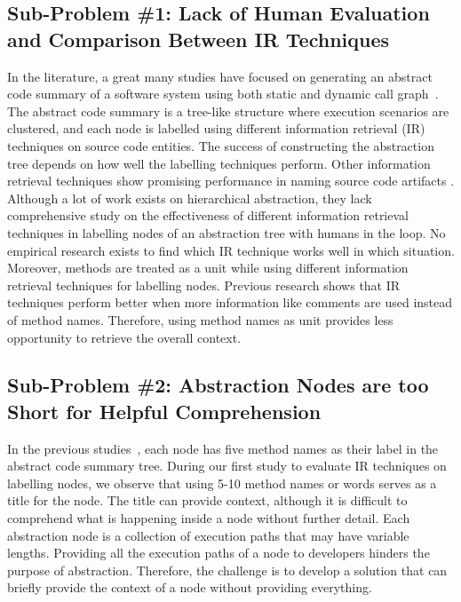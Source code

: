     \subsection{Sub-Problem \#1: Lack of Human Evaluation and Comparison Between IR Techniques} In the literature, a great many studies have focused on generating an abstract code summary of a software system using both static and dynamic call graph~\cite{feng2018hierarchicalExecutionComprehension, gharibi2018automaticStaticCluster, xin2019identifyingFeaturesExecution}. The abstract code summary is a tree-like structure where execution scenarios are clustered, and each node is labelled using different information retrieval (IR) techniques on source code entities. The success of constructing the abstraction tree depends on how well the labelling techniques perform. Other information retrieval techniques show promising performance in naming source code artifacts \cite{chen2016topicMiningRepositories, panichella2013topicModelsTasks, sun2016surveyTopicSE}. Although a lot of work exists on hierarchical abstraction, they lack comprehensive study on the effectiveness of different information retrieval techniques in labelling nodes of an abstraction tree with humans in the loop. No empirical research exists to find which IR technique works well in which situation.
Moreover, methods are treated as a unit \cite{gharibi2018automaticStaticCluster, feng2018hierarchicalExecutionComprehension} while using different information retrieval techniques for labelling nodes. Previous research \cite{de2012IRMethodsArtifacts} shows that IR techniques perform better when more information like comments are used instead of method names. Therefore, using method names as unit provides less opportunity to retrieve the overall context.
    

    \subsection{Sub-Problem \#2: Abstraction Nodes are too Short for Helpful Comprehension}
    In the previous studies~\cite{feng2018hierarchicalExecutionComprehension, gharibi2018automaticStaticCluster}, each node has five method names as their label in the abstract code summary tree. During our first study to evaluate IR techniques on labelling nodes, we observe that using 5-10 method names or words serves as a title for the node. The title can provide context, although it is difficult to comprehend what is happening inside a node without further detail. Each abstraction node is a collection of execution paths that may have variable lengths. Providing all the execution paths of a node to developers hinders the purpose of abstraction. Therefore, the challenge is to develop a solution that can briefly provide the context of a node without providing everything. 
    
